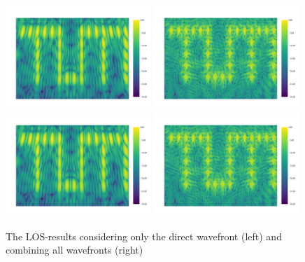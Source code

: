 \begin{figure}[p]
    \centering
    \includegraphics[page=2, width=0.49\textwidth]{figures/multipath_los_direct.pdf}
    \includegraphics[page=2, width=0.49\textwidth]{figures/multipath_los_combined.pdf}
    \includegraphics[page=1, width=0.49\textwidth]{figures/multipath_los_direct.pdf}
    \includegraphics[page=1, width=0.49\textwidth]{figures/multipath_los_combined.pdf}
    \caption{The LOS-results considering only the direct wavefront (left) and combining all wavefronts (right)}\label{fig:MultipathLOS}
\end{figure}


